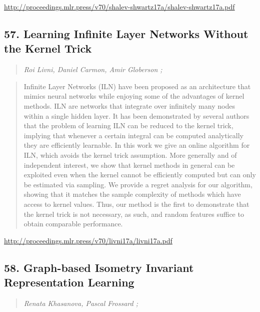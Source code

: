 \documentclass{article}
\begin{document}
\href{http://proceedings.mlr.press/v70/shalev-shwartz17a/shalev-shwartz17a.pdf}{http://proceedings.mlr.press/v70/shalev-shwartz17a/shalev-shwartz17a.pdf}

\subsection{57. Learning Infinite Layer Networks Without the Kernel Trick}

\begin{quote}
\footnotesize{\textit{Roi Livni, Daniel Carmon, Amir Globerson ;}}

\end{quote}

\begin{quote}
    Infinite Layer Networks (ILN) have been proposed as an architecture that mimics neural networks while enjoying some of the advantages of kernel methods. ILN are networks that integrate over infinitely many nodes within a single hidden layer. It has been demonstrated by several authors that the problem of learning ILN can be reduced to the kernel trick, implying that whenever a certain integral can be computed analytically they are efficiently learnable. In this work we give an online algorithm for ILN, which avoids the kernel trick assumption. More generally and of independent interest, we show that kernel methods in general can be exploited even when the kernel cannot be efficiently computed but can only be estimated via sampling. We provide a regret analysis for our algorithm, showing that it matches the sample complexity of methods which have access to kernel values. Thus, our method is the first to demonstrate that the kernel trick is not necessary, as such, and random features suffice to obtain comparable performance.  
\end{quote}

\href{http://proceedings.mlr.press/v70/livni17a/livni17a.pdf}{http://proceedings.mlr.press/v70/livni17a/livni17a.pdf}

\subsection{58. Graph-based Isometry Invariant Representation Learning}

\begin{quote}
\footnotesize{\textit{Renata Khasanova, Pascal Frossard ;}}

\end{quote}
\end{document}
